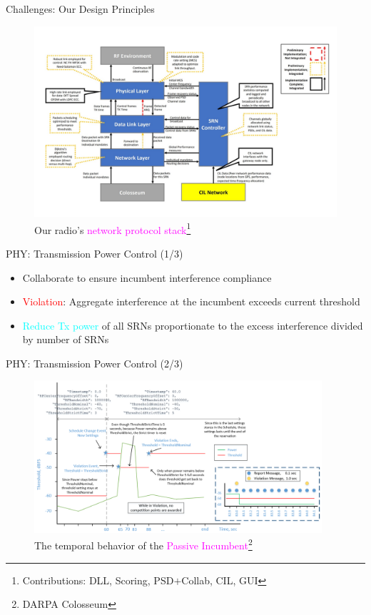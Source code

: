 \documentclass{beamer}
\begin{document}
\begin{frame}{Challenges: Our Design Principles}
\begin{figure}
    \centering
    \includegraphics[width = 1.0\textwidth]{Layer-wise-design.PNG}
    \caption{Our radio's \textcolor{magenta}{network protocol stack}\footnote{\tiny{Contributions: DLL, Scoring, PSD${+}$Collab, CIL, GUI}}}
    \label{fig:1}
\end{figure}
\end{frame}
\begin{frame}{PHY: Transmission Power Control (1/3)}
    \begin{itemize}
        \item Collaborate to ensure incumbent interference compliance
        \item \textcolor{red}{Violation}: Aggregate interference at the incumbent exceeds current threshold
        \item \textcolor{cyan}{Reduce Tx power} of all SRNs proportionate to the excess interference divided by number of SRNs
    \end{itemize}
\end{frame}
\begin{frame}{PHY: Transmission Power Control (2/3)}
\begin{figure}
    \centering
    \includegraphics[width = 0.95\textwidth]{Passive_Incumbent.jpg}
    \caption{The temporal behavior of the \textcolor{magenta}{ Passive Incumbent}\footnote{\tiny{DARPA Colosseum}}}
    \label{fig:2}
\end{figure}
\end{frame}
\end{document}
